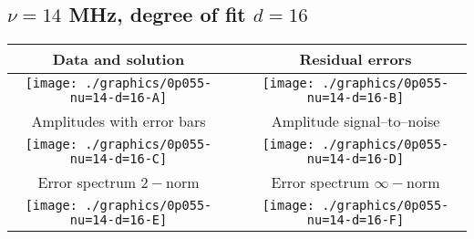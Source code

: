 

% 

\clearpage{}
\break{}

\subsection{$\nu = 14$ MHz, degree of fit $d = 16$}

\begin{table}[h]
    \begin{center}
        \begin{tabular}{ccc}
            Data and solution & \quad & Residual errors \\\hline
            \texttt{[image: ./graphics/0p055-nu=14-d=16-A]} &&
            \texttt{[image: ./graphics/0p055-nu=14-d=16-B]} \\[15pt]
            Amplitudes with error bars && Amplitude signal--to--noise \\\hline
            \texttt{[image: ./graphics/0p055-nu=14-d=16-C]} &&
            \texttt{[image: ./graphics/0p055-nu=14-d=16-D]} \\[15pt]
            Error spectrum $2-$norm && Error spectrum $\infty-$norm \\\hline
            \texttt{[image: ./graphics/0p055-nu=14-d=16-E]} &&
            \texttt{[image: ./graphics/0p055-nu=14-d=16-F]} \\[15pt]
        \end{tabular}
    \end{center}
\label{fig:elev=55, nu=14}
\end{table}



\endinput
